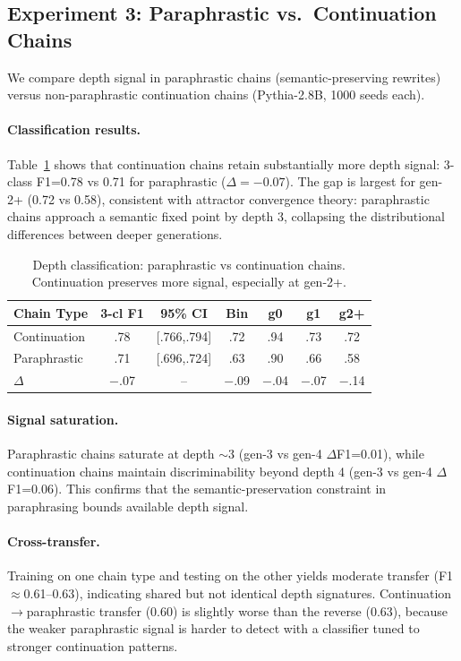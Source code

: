 \documentclass[11pt,a4paper]{article}
\begin{document}
\subsection{Experiment 3: Paraphrastic vs.\ Continuation Chains}
\label{sec:exp3}

We compare depth signal in paraphrastic chains (semantic-preserving rewrites) versus non-paraphrastic continuation chains (Pythia-2.8B, 1000 seeds each).

\paragraph{Classification results.} Table~\ref{tab:para} shows that continuation chains retain substantially more depth signal: 3-class F1=0.78 vs 0.71 for paraphrastic ($\Delta{=}{-}0.07$). The gap is largest for gen-2+ (0.72 vs 0.58), consistent with attractor convergence theory: paraphrastic chains approach a semantic fixed point by depth 3, collapsing the distributional differences between deeper generations.

\begin{table}[t]
\centering
\small
\begin{tabular}{lcccccc}
\toprule
Chain Type & 3-cl F1 & 95\% CI & Bin & g0 & g1 & g2+ \\
\midrule
Continuation & .78 & [.766,.794] & .72 & .94 & .73 & .72 \\
Paraphrastic & .71 & [.696,.724] & .63 & .90 & .66 & .58 \\
$\Delta$ & $-$.07 & -- & $-$.09 & $-$.04 & $-$.07 & $-$.14 \\
\bottomrule
\end{tabular}
\caption{Depth classification: paraphrastic vs continuation chains. Continuation preserves more signal, especially at gen-2+.}
\label{tab:para}
\end{table}

\paragraph{Signal saturation.} Paraphrastic chains saturate at depth ${\sim}3$ (gen-3 vs gen-4 $\Delta$F1=0.01), while continuation chains maintain discriminability beyond depth 4 (gen-3 vs gen-4 $\Delta$F1=0.06). This confirms that the semantic-preservation constraint in paraphrasing bounds available depth signal.

\paragraph{Cross-transfer.} Training on one chain type and testing on the other yields moderate transfer (F1${\approx}$0.61--0.63), indicating shared but not identical depth signatures. Continuation$\to$paraphrastic transfer (0.60) is slightly worse than the reverse (0.63), because the weaker paraphrastic signal is harder to detect with a classifier tuned to stronger continuation patterns.
\end{document}
